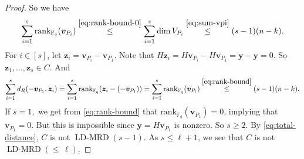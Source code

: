 \documentclass[11pt]{article}
\newif\ifmynotes
\newcommand{\ZGnote}[1]{\ifmynotes\textcolor{purple}{[Zeyu: #1]}\else\fi}
\newcommand{\CYnote}[1]{\ifmynotes\textcolor{orange}{[Chen: #1]}\else\fi}
\theoremstyle{plain}
\theoremstyle{definition}
\theoremstyle{remark}
\newcommand{\ldmrd}[1]{\operatorname{LD-MRD}({\leq}\,#1)}
\newcommand{\F}{\mathbb{F}}
\newcommand{\bv}{\bm{v}}
\newcommand{\bu}{\bm{u}}
\newcommand{\by}{\bm{y}}
\newcommand{\bz}{\bm{z}}
\newcommand{\rank}{\mathrm{rank}}
\begin{document}
\begin{proof}
So we have 
\begin{equation}\label{eq:rank-bound}
\sum_{i=1}^s \rank_{\F_q}(\bv_{P_i})\stackrel{\eqref{eq:rank-bound-0}}{\leq} \sum_{i=1}^s \dim V_{P_i}\stackrel{\eqref{eq:sum-vpi}}{\leq} (s-1)(n-k).
\end{equation}
For $i\in [s]$, let $\bz_i=\bv_{P_i}-\bv_{P_1}$. Note that $H \bz_i=H \bv_{P_i}-H \bv_{P_1}=\by-\by=0$. So $\bz_1,\dots,\bz_s\in C$. And
\begin{equation}\label{eq:total-distance}
\sum_{i=1}^s d_R(-\bv_{P_1}, \bz_i)
=\sum_{i=1}^s \rank_{\F_q}(\bz_i-(-\bv_{P_1}))
=\sum_{i=1}^s \rank_{\F_q}(\bv_{P_i})\stackrel{\eqref{eq:rank-bound}}{\leq} (s-1)(n-k).
\end{equation}
If $s=1,$ we get from \eqref{eq:rank-bound} that $\rank_{\F_q}(\bv_{P_1})=0$, implying that $\bv_{P_1}=0$. But this is impossible since $\by=H \bv_{P_1}$ is nonzero. So $s\geq 2$.
By \eqref{eq:total-distance}, $C$ is not $\operatorname{LD-MRD}(s-1)$. As $s\leq \ell+1$, we see that $C$ is not $\ldmrd{\ell}$.
\end{proof}
\end{document}

